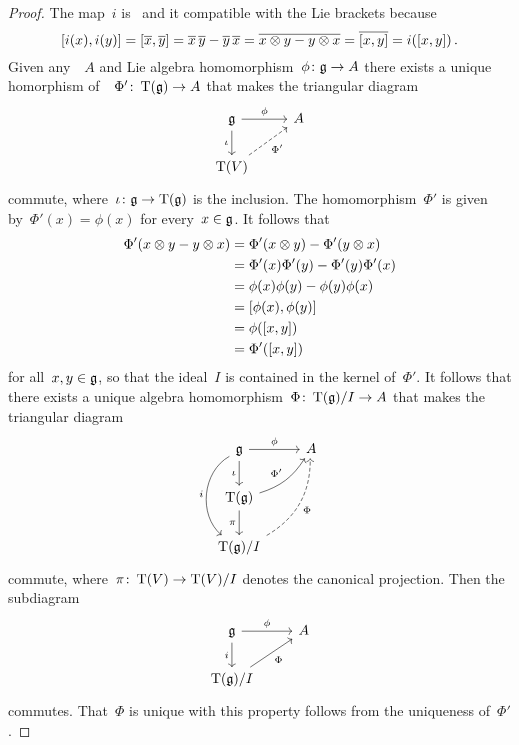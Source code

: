 \begin{proof}
  The map~$i$ is~{\linear{$\kf$}} and it compatible with the Lie brackets because
  \[
    [i(x), i(y)]
    =
    [\overline{x}, \overline{y}]
    =
    \overline{x} \, \overline{y} - \overline{y} \, \overline{x}
    =
    \overline{x \otimes y - y \otimes x}
    =
    \overline{[x,y]}
    =
    i([x,y]) \,.
  \]
  Given any~{\algebra{$\kf$}}~$A$ and Lie algebra homomorphism~$\phi \colon \mathfrak{g} \to A$ there exists a unique homorphism of~{\algebras{$\kf$}}~$\Phi' \colon \operatorname{T}(\mathfrak{g}) \to A$ that makes the triangular diagram
  \[
    \begin{tikzcd}
      \glie
      \arrow{r}[above]{\phi}
      \arrow{d}[left]{\iota}
      &
      A
      \\
      \Tensor(V)
      \arrow[dashed]{ur}[below right]{\Phi'}
      &
      {}
    \end{tikzcd}
  \]
  commute, where~$\iota \colon \mathfrak{g} \to \operatorname{T}(\mathfrak{g})$ is the inclusion.
  The homomorphism~$\Phi'$ is given by~$\Phi'(x) = \phi(x)$ for every~$x \in \mathfrak{g}$.
  It follows that
  \begin{align*}
    \Phi'(x \otimes y - y \otimes x)
    &=
    \Phi'(x \otimes y) - \Phi'(y \otimes x)
    \\
    &=
    \Phi'(x) \Phi'(y) - \Phi'(y) \Phi'(x)
    \\
    &=
    \phi(x) \phi(y) - \phi(y) \phi(x)
    \\
    &=
    [\phi(x), \phi(y)]
    \\
    &=
    \phi([x,y])
    \\
    &=
    \Phi'([x,y])
  \end{align*}
  for all~$x, y \in \mathfrak{g}$, so that the ideal~$I$ is contained in the kernel of~$\Phi'$.
  It follows that there exists a unique algebra homomorphism~$\Phi \colon \operatorname{T}(\mathfrak{g})/I \to A$ that makes the triangular diagram
  \[
    \begin{tikzcd}
      \glie
      \arrow{r}[above]{\phi}
      \arrow{d}[left]{\iota}
      \arrow[bend right = 55]{dd}[left]{i}
      &
      A
      \\
      \Tensor(\glie)
      \arrow[bend right= 20]{ur}[above left]{\Phi'}
      \arrow{d}[left]{\pi}
      &
      {}
      \\
      \Tensor(\glie)/I
      \arrow[dashed, bend right = 30]{uur}[below right]{\Phi}
      &
      {}
    \end{tikzcd}
  \]
  commute, where~$\pi \colon \operatorname{T}(V) \to \operatorname{T}(V)/I$ denotes the canonical projection.
  Then the subdiagram
  \[
    \begin{tikzcd}
      \glie
      \arrow{r}[above]{\phi}
      \arrow{d}[left]{i}
      &
      A
      \\
      \Tensor(\glie)/I
      \arrow{ur}[below right]{\Phi}
      &
      {}
    \end{tikzcd}
  \]
  commutes.
  That~$\Phi$ is unique with this property follows from the uniqueness of~$\Phi'$.
\end{proof}


